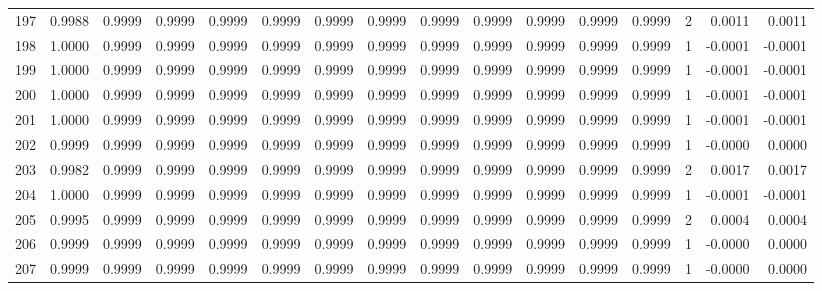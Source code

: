 \begin{tabular}{lrrrrrrrrrrrrrrr}
197 &      0.9988 &  0.9999 &  0.9999 &  0.9999 &  0.9999 &  0.9999 &  0.9999 &  0.9999 &  0.9999 &  0.9999 &   0.9999 &     0.9999 &      2 &                    0.0011 &                     0.0011 \\
198 &      1.0000 &  0.9999 &  0.9999 &  0.9999 &  0.9999 &  0.9999 &  0.9999 &  0.9999 &  0.9999 &  0.9999 &   0.9999 &     0.9999 &      1 &                   -0.0001 &                    -0.0001 \\
199 &      1.0000 &  0.9999 &  0.9999 &  0.9999 &  0.9999 &  0.9999 &  0.9999 &  0.9999 &  0.9999 &  0.9999 &   0.9999 &     0.9999 &      1 &                   -0.0001 &                    -0.0001 \\
200 &      1.0000 &  0.9999 &  0.9999 &  0.9999 &  0.9999 &  0.9999 &  0.9999 &  0.9999 &  0.9999 &  0.9999 &   0.9999 &     0.9999 &      1 &                   -0.0001 &                    -0.0001 \\
201 &      1.0000 &  0.9999 &  0.9999 &  0.9999 &  0.9999 &  0.9999 &  0.9999 &  0.9999 &  0.9999 &  0.9999 &   0.9999 &     0.9999 &      1 &                   -0.0001 &                    -0.0001 \\
202 &      0.9999 &  0.9999 &  0.9999 &  0.9999 &  0.9999 &  0.9999 &  0.9999 &  0.9999 &  0.9999 &  0.9999 &   0.9999 &     0.9999 &      1 &                   -0.0000 &                     0.0000 \\
203 &      0.9982 &  0.9999 &  0.9999 &  0.9999 &  0.9999 &  0.9999 &  0.9999 &  0.9999 &  0.9999 &  0.9999 &   0.9999 &     0.9999 &      2 &                    0.0017 &                     0.0017 \\
204 &      1.0000 &  0.9999 &  0.9999 &  0.9999 &  0.9999 &  0.9999 &  0.9999 &  0.9999 &  0.9999 &  0.9999 &   0.9999 &     0.9999 &      1 &                   -0.0001 &                    -0.0001 \\
205 &      0.9995 &  0.9999 &  0.9999 &  0.9999 &  0.9999 &  0.9999 &  0.9999 &  0.9999 &  0.9999 &  0.9999 &   0.9999 &     0.9999 &      2 &                    0.0004 &                     0.0004 \\
206 &      0.9999 &  0.9999 &  0.9999 &  0.9999 &  0.9999 &  0.9999 &  0.9999 &  0.9999 &  0.9999 &  0.9999 &   0.9999 &     0.9999 &      1 &                   -0.0000 &                     0.0000 \\
207 &      0.9999 &  0.9999 &  0.9999 &  0.9999 &  0.9999 &  0.9999 &  0.9999 &  0.9999 &  0.9999 &  0.9999 &   0.9999 &     0.9999 &      1 &                   -0.0000 &                     0.0000 \\

\end{tabular}
